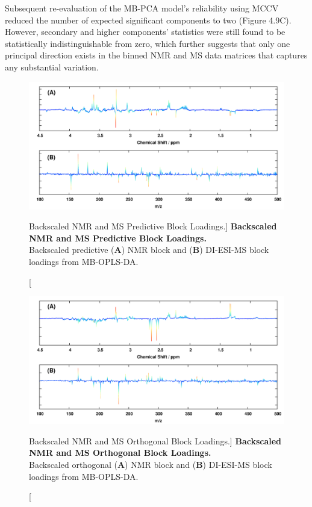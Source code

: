 \begin{doublespace}
Subsequent re-evaluation of the MB-PCA model's reliability using MCCV reduced
the number of expected significant components to two (Figure 4.9C). However,
secondary and higher components' \qsq{} statistics were still found to be
statistically indistinguishable from zero, which further suggests that only
one principal direction exists in the binned NMR and MS data matrices that
captures any substantial variation.
\end{doublespace}

\begin{figure}[ht!]
\includegraphics[width=6.5in]{figs/apps/12-mbopls-p.png}
\caption
      [Backscaled NMR and MS Predictive Block Loadings.]{
  {\bf Backscaled NMR and MS Predictive Block Loadings.}
  \\
  Backscaled predictive ({\bf A}) \hnmr{} NMR block and ({\bf B}) DI-ESI-MS
  block loadings from MB-OPLS-DA.
}
\end{figure}

\begin{figure}[ht!]
\includegraphics[width=6.5in]{figs/apps/13-mbopls-po.png}
\caption
      [Backscaled NMR and MS Orthogonal Block Loadings.]{
  {\bf Backscaled NMR and MS Orthogonal Block Loadings.}
  \\
  Backscaled orthogonal ({\bf A}) \hnmr{} NMR block and ({\bf B}) DI-ESI-MS
  block loadings from MB-OPLS-DA.
}
\end{figure}

